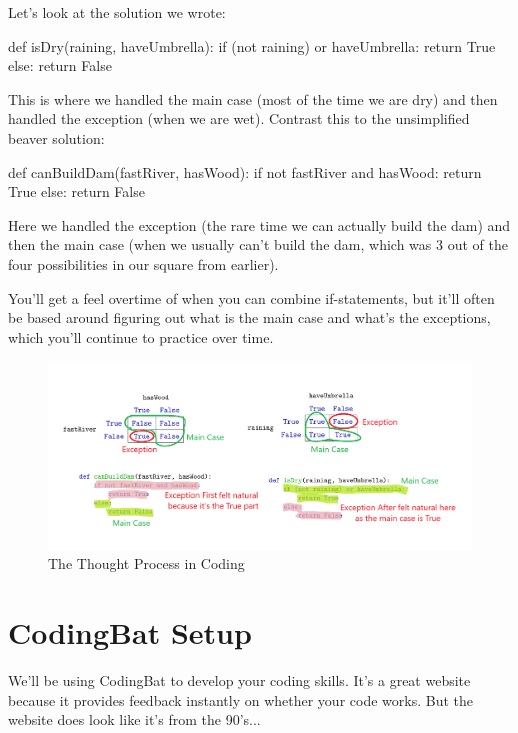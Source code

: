 \documentclass[12pt]{scrartcl}
\begin{document}
Let's look at the  solution we wrote:

\begin{python}
    def isDry(raining, haveUmbrella):
        if (not raining) or haveUmbrella:
            return True
        else:
            return False
\end{python}

This is where we handled the main case (most of the time we are dry) and then handled the exception (when we are wet). Contrast this to the unsimplified beaver solution:

\begin{python}
    def canBuildDam(fastRiver, hasWood):
        if not fastRiver and hasWood:
            return True
        else:
            return False
\end{python}

Here we handled the exception (the rare time we can actually build the dam) and then the main case (when we usually can't build the dam, which was 3 out of the four possibilities in our square from earlier).

You'll get a feel overtime of when you can combine if-statements, but it'll often be based around figuring out what is the main case and what's the exceptions, which you'll continue to practice over time.

\begin{figure}[H]
    \centering
    \includegraphics[scale=0.4]{Exception vs Main First.png}
    \caption*{The Thought Process in Coding}
\end{figure}

\newpage
\section{CodingBat Setup}
We'll be using CodingBat to develop your coding skills. It's a great website because it provides feedback instantly on whether your code works. But the website does look like it's from the 90's...
\end{document}
